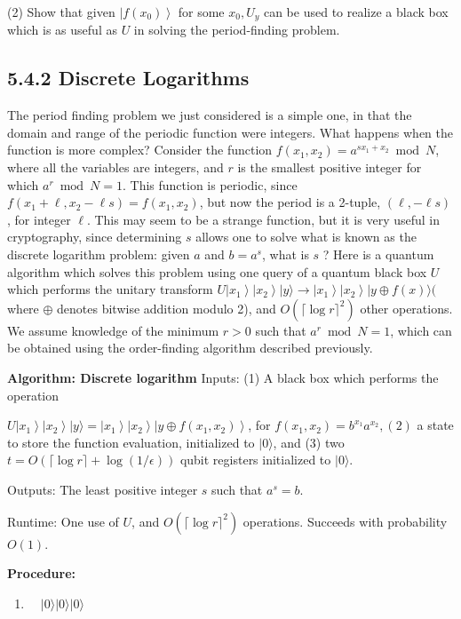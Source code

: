 (2) Show that given $\left|f\left(x_{0}\right)\right\rangle$ for some $x_{0}, U_{y}$ can be used to realize a black box which is as useful as $U$ in solving the period-finding problem.

\subsection{5.4.2 Discrete Logarithms}
The period finding problem we just considered is a simple one, in that the domain and range of the periodic function were integers. What happens when the function is more complex? Consider the function $f\left(x_{1}, x_{2}\right)=a^{s x_{1}+x_{2}} \bmod N$, where all the variables are integers, and $r$ is the smallest positive integer for which $a^{r} \bmod N=1$. This function is periodic, since $f\left(x_{1}+\ell, x_{2}-\ell s\right)=f\left(x_{1}, x_{2}\right)$, but now the period is a 2-tuple, $(\ell,-\ell s)$, for integer $\ell$. This may seem to be a strange function, but it is very useful in cryptography, since determining $s$ allows one to solve what is known as the discrete logarithm problem: given $a$ and $b=a^{s}$, what is $s$ ? Here is a quantum algorithm which solves this problem using one query of a quantum black box $U$ which performs the unitary transform $U\left|x_{1}\right\rangle\left|x_{2}\right\rangle|y\rangle \rightarrow\left|x_{1}\right\rangle\left|x_{2}\right\rangle|y \oplus f(x)\rangle($ where $\oplus$ denotes bitwise addition modulo 2), and $O\left(\lceil\log r\rceil^{2}\right)$ other operations. We assume knowledge of the minimum $r>0$ such that $a^{r} \bmod N=1$, which can be obtained using the order-finding algorithm described previously.

\textbf{Algorithm: Discrete logarithm}
Inputs: (1) A black box which performs the operation

$U\left|x_{1}\right\rangle\left|x_{2}\right\rangle|y\rangle=\left|x_{1}\right\rangle\left|x_{2}\right\rangle\left|y \oplus f\left(x_{1}, x_{2}\right)\right\rangle$, for $f\left(x_{1}, x_{2}\right)=b^{x_{1}} a^{x_{2}},(2)$ a state to store the function evaluation, initialized to $|0\rangle$, and (3) two $t=O(\lceil\log r\rceil+\log (1 / \epsilon))$ qubit registers initialized to $|0\rangle$.

Outputs: The least positive integer $s$ such that $a^{s}=b$.

Runtime: One use of $U$, and $O\left(\lceil\log r\rceil^{2}\right)$ operations. Succeeds with probability $O(1)$.

\textbf{Procedure:}
\begin{enumerate}
    \item $\quad|0\rangle|0\rangle|0\rangle$
\end{enumerate}

